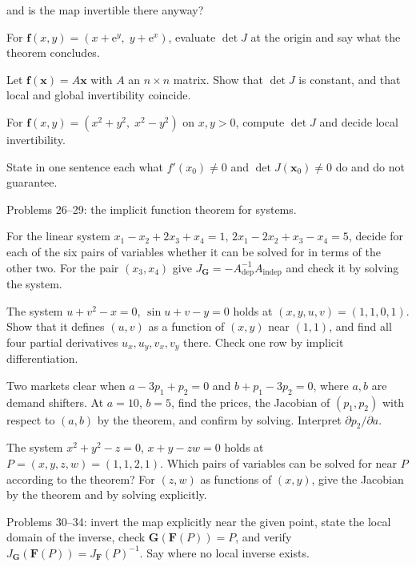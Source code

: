 \begin{problems}
        and is the map invertible there anyway?
  \item For $\mathbf{f}(x,y)=(x+\mathrm{e}^{y},\;y+\mathrm{e}^{x})$,
        evaluate $\det J$ at the origin and say what the theorem concludes.
  \item Let $\mathbf{f}(\mathbf{x})=A\mathbf{x}$ with $A$ an $n\times n$
        matrix. Show that $\det J$ is constant, and that local and global
        invertibility coincide.
  \item For $\mathbf{f}(x,y)=(x^{2}+y^{2},\;x^{2}-y^{2})$ on $x,y>0$,
        compute $\det J$ and decide local invertibility.
  \item State in one sentence each what $f'(x_{0})\neq0$ and
        $\det J(\mathbf{x}_{0})\neq0$ do and do not guarantee.
\end{problems}

Problems 26--29: the implicit function theorem for systems.

\begin{problems}[resume]
  \item For the linear system $x_{1}-x_{2}+2x_{3}+x_{4}=1$,
        $2x_{1}-2x_{2}+x_{3}-x_{4}=5$, decide for each of the six pairs of
        variables whether it can be solved for in terms of the other two.
        For the pair $(x_{3},x_{4})$ give
        $J_{\mathbf{G}}=-A_{\mathrm{dep}}^{-1}A_{\mathrm{indep}}$ and check it
        by solving the system.
  \item The system $u+v^{2}-x=0$, $\sin u+v-y=0$ holds at
        $(x,y,u,v)=(1,1,0,1)$. Show that it defines $(u,v)$ as a function
        of $(x,y)$ near $(1,1)$, and find all four partial derivatives
        $u_{x},u_{y},v_{x},v_{y}$ there. Check one row by implicit
        differentiation.
  \item Two markets clear when $a-3p_{1}+p_{2}=0$ and $b+p_{1}-3p_{2}=0$,
        where $a,b$ are demand shifters. At $a=10$, $b=5$, find the prices,
        the Jacobian of $(p_{1},p_{2})$ with respect to $(a,b)$ by the
        theorem, and confirm by solving. Interpret $\partial p_{2}/\partial a$.
  \item The system $x^{2}+y^{2}-z=0$, $x+y-zw=0$ holds at
        $P=(x,y,z,w)=(1,1,2,1)$. Which pairs of variables can be solved for
        near $P$ according to the theorem? For $(z,w)$ as functions of
        $(x,y)$, give the Jacobian by the theorem and by solving explicitly.
\end{problems}

Problems 30--34: invert the map explicitly near the given point, state the
local domain of the inverse, check $\mathbf{G}(\mathbf{F}(P))=P$, and verify
$J_{\mathbf{G}}(\mathbf{F}(P))=J_{\mathbf{F}}(P)^{-1}$. Say where no local
inverse exists.

